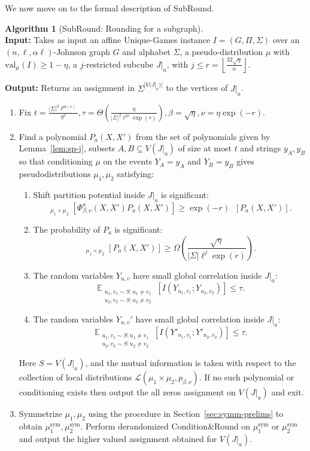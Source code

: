 \documentclass[11pt]{article}
\DeclareMathOperator*{\E}{\mathbb{E}}
\DeclareMathOperator*{\pE}{\widetilde{\mathbb{E}}}
\newcommand\skipi{{\vskip 10pt}}
\def \cL {\mathcal{L}}
\def \sym {\text{sym}}
\def \val {\mathrm{val}}
\theoremstyle{definition}
\newtheorem{algorithm-thm}[theorem]{Algorithm}
\begin{document}
\skipi
We now move on to the formal description of SubRound.
\begin{algorithm-thm}[SubRound: Rounding for a subgraph]\label{alg:j-partial} ~\\
\textbf{Input:} Takes as input an affine Unique-Games instance $I = (G, \Pi, \Sigma)$ over an $(n,\ell,\alpha\ell)$-Johnson graph $G$ and alphabet $\Sigma$, a pseudo-distribution $\mu$ with $\val_\mu(I) \geq 1- \eta$, a $j$-restricted subcube $J|_a$, with $j \leq r = \left\lfloor\frac{32\sqrt{\eta}}{\alpha}\right\rfloor$. 

\noindent\textbf{Output:} Returns an assignment in $\Sigma^{|V(J|_a)|}$ to the vertices of $J|_a$. 
\begin{enumerate}
\item Fix $t = \frac{|\Sigma|^3\ell^{\Theta(r)}}{\eta^3}, \tau = \Theta(\frac{\eta}{|\Sigma|^2\ell^{2r}\exp(r)}), \beta = \sqrt{\eta}, \nu = \eta\exp(-r)$.
\item Find a polynomial $P_a(X,X')$ from the set of polynomials given by Lemma~\ref{lem:sp-j}, subsets $A, B \subseteq V(J|_a)$ of size at most $t$ and strings $y_A, y_B$ so that conditioning $\mu$ on the events $Y_A = y_A$ and $Y_B = y_B$ gives pseudodistributions $\mu_1, \mu_2$ satisfying:
\begin{enumerate}
\item 
Shift partition potential inside $J|_{a}$ is significant: 
\[
\pE_{\mu_1 \times \mu_2}[\Phi^a_{\beta,\nu}(X,X')P_a(X,X')] \geq \exp(-r) \pE[P_a(X,X')].
\]
\item The probability of $P_a$ is significant:
\[
\pE_{\mu_1 \times \mu_2}[P_a(X,X')] \geq \Omega\left(\frac{\sqrt{\eta}}{|\Sigma|\ell^{j}\exp(r)}\right).
\]
\item The random variables $Y_{u,v}$ have small global correlation inside $J|_a$: 
\[\E_{\substack{u_1,v_1 \sim S: u_1 \neq v_1\\ u_2,v_2 \sim S: u_2 \neq v_2}}[I(Y_{u_1,v_1};Y_{u_2,v_2})] \leq \tau.
\]
\item The random variables $Y_{u,v}'$ have small global correlation inside $J|_a$: \[
\E_{\substack{u_1,v_1 \sim S: u_1 \neq v_1\\ u_2,v_2 \sim S: u_2 \neq v_2}}[I(Y'_{u_1,v_1};Y'_{u_2,v_2})] \leq \tau.
\]
\end{enumerate}
Here $S = V(J|_a)$, and the mutual information is taken with respect to the collection of local distributions $\cL(\mu_1 \times \mu_2,p_{\beta,\nu})$. If no such polynomial or conditioning exists then output the all zeros assignment on $V(J|_a)$ and exit.
\item Symmetrize $\mu_1, \mu_2$ using the procedure in Section~\ref{sec:symm-prelims} to obtain $\mu^{\sym}_1, \mu^{\sym}_2$. Perform derandomized Condition\&Round on $\mu^{\sym}_1$ or $\mu^{\sym}_2$ and output the higher valued assignment obtained for $V(J|_a)$.
\end{enumerate}
\end{algorithm-thm}
\end{document}
